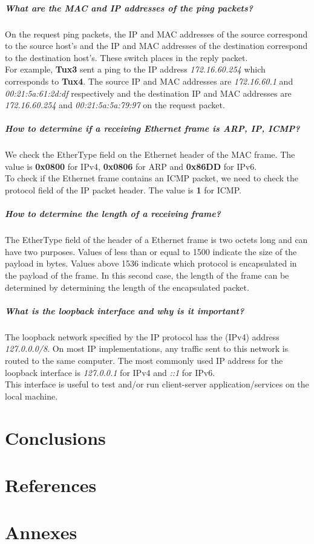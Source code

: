 \documentclass[11pt]{report}
\begin{document}
\paragraph{What are the MAC and IP addresses of the ping packets?}
On the request ping packets, the IP and MAC addresses of the source correspond
to the source host's and the IP and MAC addresses of the destination correspond
to the destination host's. These switch places in the reply packet.\\
For example, \textbf{Tux3} sent a ping to the IP address \textit{172.16.60.254}
which corresponds to \textbf{Tux4}. The source IP and MAC addresses are
\textit{172.16.60.1} and \textit{00:21:5a:61:2d:df} respectively and the destination
IP and MAC addresses are \textit{172.16.60.254} and \textit{00:21:5a:5a:79:97}
on the request packet.

\paragraph{How to determine if a receiving Ethernet frame is ARP, IP, ICMP?}
We check the EtherType field on the Ethernet header of the MAC frame. The value is
\textbf{0x0800} for IPv4, \textbf{0x0806} for ARP and \textbf{0x86DD} for IPv6.\\
To check if the Ethernet frame contains an ICMP packet, we need to check the
protocol field of the IP packet header. The value is \textbf{1} for ICMP.

\paragraph{How to determine the length of a receiving frame?}
The EtherType field of the header of a Ethernet frame is two octets long and can
have two purposes. Values of less than or equal to 1500 indicate the size of the
payload in bytes. Values above 1536 indicate which protocol is encapsulated in
the payload of the frame. In this second case, the length of the frame can be
determined by determining the length of the encapsulated packet.

\paragraph{What is the loopback interface and why is it important?}
The loopback network specified by the IP protocol has the (IPv4) address
\textit{127.0.0.0/8}. On most IP implementations, any traffic sent to this network
is routed to the same computer. The most commonly used IP address for the
loopback interface is \textit{127.0.0.1} for IPv4 and \textit{::1} for IPv6.\\
This interface is useful to test and/or run client-server application/services
on the local machine.

\chapter{Conclusions}

\chapter{References}

\chapter{Annexes}
\end{document}

